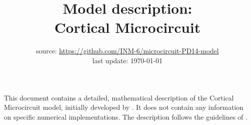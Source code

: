 \documentclass[10pt,a4paper,twoside,american]{article}
\theoremstyle{definitionstyle}
\begin{document}
\title{Model description:\\ \textbf{Cortical Microcircuit} \citep{Potjans14}}
\author{}
\date{%
  source: \href{https://github.com/INM-6/microcircuit-PD14-model}{https://github.com/INM-6/microcircuit-PD14-model}\\[1ex]
  last update: \today\\
}
\maketitle
\thispagestyle{empty}
\noindent
This document contains a detailed, mathematical description of the Cortical Microcircuit model, initially developed by \citet{Potjans14}.
It does not contain any information on specific numerical implementations.
The description follows the guidelines of \citet{Nordlie09_e1000456}.

\def\marg{1ex}
\setlength{\parindent}{0pt}

\tableofcontents
\clearpage
\end{document}
